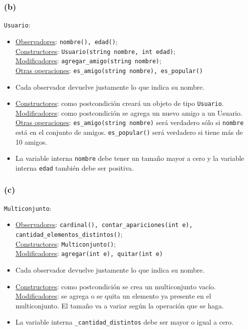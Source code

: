 \documentclass[12 pt]{article}
\begin{document}
    \subsubsection*{(b)}
        \texttt{Usuario}:
        \begin{itemize}
            \item \underline{Observadores}: \texttt{nombre(), edad()}; 
            \\
            \underline{Constructores}: \texttt{Usuario(string nombre, int edad)}; 
            \\
            \underline{Modificadores}: \texttt{agregar\_amigo(string nombre)};
            \\
            \underline{Otras operaciones}: \texttt{es\_amigo(string nombre), es\_popular()}
            \item Cada observador devuelve justamente lo que indica su nombre.
            \item \underline{Constructores}: como postcondición creará un objeto de tipo \texttt{Usuario}.
            \\
            \underline{Modificadores}: como postcondición se agrega un nuevo amigo a un Usuario.
            \\
            \underline{Otras operaciones}: \texttt{es\_amigo(string nombre)} será verdadero sólo si \texttt{nombre} está en el conjunto de amigos. \texttt{es\_popular()} será verdadero si tiene más de 10 amigos.
            \item La variable interna \texttt{nombre} debe tener un tamaño mayor a cero y la variable interna \texttt{edad} también debe ser positiva.
        \end{itemize}

    \subsubsection*{(c)}
        \texttt{Multiconjunto}:
        \begin{itemize}
            \item \underline{Observadores}: \texttt{cardinal(), contar\_apariciones(int e), cantidad\_elementos\_distintos()}; 
            \\
            \underline{Constructores}: \texttt{Multiconjunto()}; 
            \\
            \underline{Modificadores}: \texttt{agregar(int e), quitar(int e)}
            \item Cada observador devuelve justamente lo que indica su nombre.
            \item \underline{Constructores}: como postcondición se crea un multiconjunto vacío.
            \\
            \underline{Modificadores}: se agrega o se quita un elemento ya presente en el multiconjunto. El tamaño va a variar según la operación que se haga.
            \item La variable interna \texttt{\_cantidad\_distintos} debe ser mayor o igual a cero.
        \end{itemize}
\end{document}
